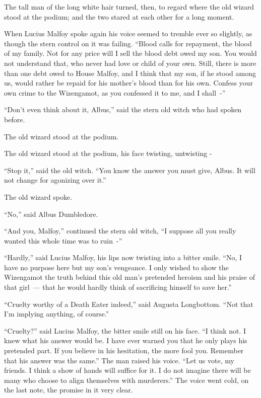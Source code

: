 The tall man of the long white hair turned, then, to regard where the old wizard stood at the podium; and the two stared at each other for a long moment.

When Lucius Malfoy spoke again his voice seemed to tremble ever so slightly, as though the stern control on it was failing. ``Blood calls for repayment, the blood of my family. Not for any price will I sell the blood debt owed my son. You would not understand that, who never had love or child of your own. Still, there is more than one debt owed to House Malfoy, and I think that my son, if he stood among us, would rather be repaid for his mother's blood than for his own. Confess your own crime to the Wizengamot, as you confessed it to me, and I shall~-''

``Don't even think about it, Albus,'' said the stern old witch who had spoken before.

The old wizard stood at the podium.

The old wizard stood at the podium, his face twisting, untwisting -

``Stop it,'' said the old witch. ``You know the answer you must give, Albus. It will not change for agonizing over it.''

The old wizard spoke.

``No,'' said Albus Dumbledore.

``And you, Malfoy,'' continued the stern old witch, ``I suppose all you really wanted this whole time was to ruin~-''

``Hardly,'' said Lucius Malfoy, his lips now twisting into a bitter smile. ``No, I have no purpose here but my son's vengeance. I only wished to show the Wizengamot the truth behind this old man's pretended heroism and his praise of that girl~--- that he would hardly think of sacrificing himself to save her.''

``Cruelty worthy of a Death Eater indeed,'' said Augusta Longbottom. ``Not that I'm implying anything, of course.''

``Cruelty?'' said Lucius Malfoy, the bitter smile still on his face. ``I think not. I knew what his answer would be. I have ever warned you that he only plays his pretended part. If you believe in his hesitation, the more fool you. Remember that his answer was the same.'' The man raised his voice. ``Let us vote, my friends. I think a show of hands will suffice for it. I do not imagine there will be many who choose to align themselves with murderers.'' The voice went cold, on the last note, the promise in it very clear.

